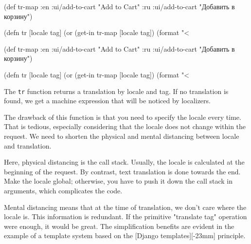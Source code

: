 \ifx\DEVICETYPE\MOBILE

  \begin{clojure}
(def tr-map
  {:en {:ui/add-to-cart "Add to Cart"}
   :ru {:ui/add-to-cart
        "Добавить в корзину"}})

(defn tr [locale tag]
  (or (get-in tr-map [locale tag])
      (format "<%
  \end{clojure}

\else

  \begin{clojure}
(def tr-map
  {:en {:ui/add-to-cart "Add to Cart"}
   :ru {:ui/add-to-cart "Добавить в корзину"}})

(defn tr [locale tag]
  (or (get-in tr-map [locale tag])
      (format "<%
  \end{clojure}

\fi


The \verb|tr| function returns a translation by locale and tag. If no translation is found, we get a machine expression that will be noticed by localizers.

The drawback of this function is that you need to specify the locale every time.
That is tedious, especially considering that the locale does not change within the request.
We need to shorten the physical and mental distancing between locale and translation.


Here, physical distancing is the call stack.
Usually, the locale is calculated at the beginning of the request. By contrast, text translation is done towards the end.
Make the locale global; otherwise, you have to push it down the call stack in arguments, which complicates the code.


Mental distancing means that at the time of translation, we don't care where the locale is.
This information is redundant.
If the primitive "translate tag" operation were enough, it would be great. The simplification benefits are evident in the example of a template system based on the [Django templates][-23mm] principle.


